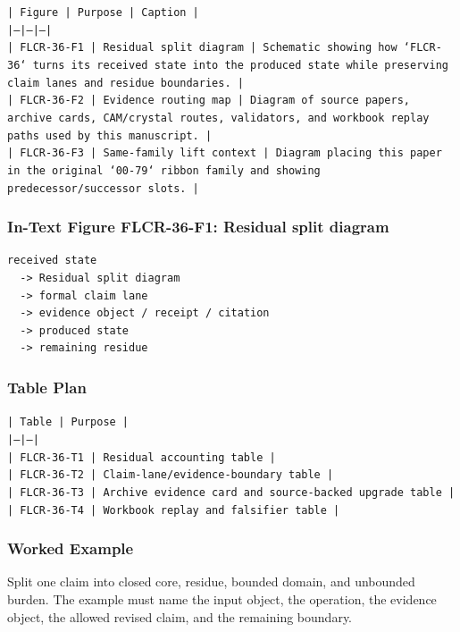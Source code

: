 \documentclass[11pt]{article}
\begin{document}
\noindent\texttt{| Figure | Purpose | Caption |}\\
\noindent\texttt{|---|---|---|}\\
\noindent\texttt{| FLCR-36-F1 | Residual split diagram | Schematic showing how `FLCR-36` turns its received state into the produced state while preserving claim lanes and residue boundaries. |}\\
\noindent\texttt{| FLCR-36-F2 | Evidence routing map | Diagram of source papers, archive cards, CAM/crystal routes, validators, and workbook replay paths used by this manuscript. |}\\
\noindent\texttt{| FLCR-36-F3 | Same-family lift context | Diagram placing this paper in the original `00-79` ribbon family and showing predecessor/successor slots. |}\\

\subsubsection*{In-Text Figure FLCR-36-F1: Residual split diagram}

\begin{verbatim}
received state
  -> Residual split diagram
  -> formal claim lane
  -> evidence object / receipt / citation
  -> produced state
  -> remaining residue
\end{verbatim}

\subsubsection*{Table Plan}

\noindent\texttt{| Table | Purpose |}\\
\noindent\texttt{|---|---|}\\
\noindent\texttt{| FLCR-36-T1 | Residual accounting table |}\\
\noindent\texttt{| FLCR-36-T2 | Claim-lane/evidence-boundary table |}\\
\noindent\texttt{| FLCR-36-T3 | Archive evidence card and source-backed upgrade table |}\\
\noindent\texttt{| FLCR-36-T4 | Workbook replay and falsifier table |}\\

\subsubsection*{Worked Example}

Split one claim into closed core, residue, bounded domain, and unbounded burden. The example must name the input object, the operation,
the evidence object, the allowed revised claim, and the remaining boundary.
\end{document}
